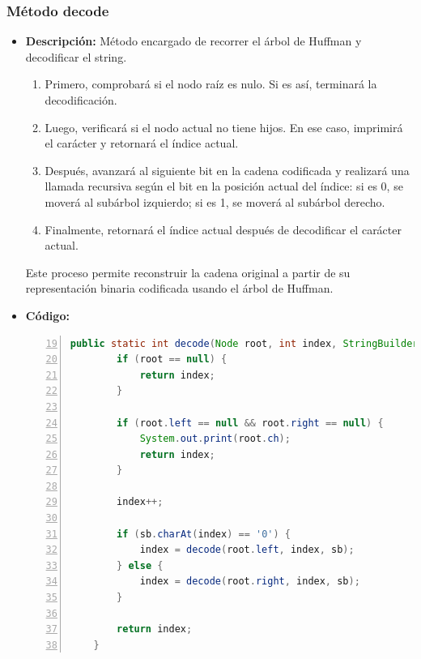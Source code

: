 \documentclass{article}
\begin{document}
  \subsubsection{Método decode}
  \begin{itemize}
    \item \textbf{Descripción: }Método encargado de recorrer el árbol de Huffman y decodificar el string.
    \begin{enumerate}
      \item Primero, comprobará si el nodo raíz es nulo. Si es así, terminará la decodificación.
      \item Luego, verificará si el nodo actual no tiene hijos. En ese caso, imprimirá el carácter y retornará el índice actual.
      \item Después, avanzará al siguiente bit en la cadena codificada y realizará una llamada recursiva según el bit en la posición actual del índice: si es 0, se moverá al subárbol izquierdo; si es 1, se moverá al subárbol derecho.
      \item Finalmente, retornará el índice actual después de decodificar el carácter actual.
    \end{enumerate}
    Este proceso permite reconstruir la cadena original a partir de su representación binaria codificada usando 
    el árbol de Huffman.
    \item \textbf{Código: }
    \begin{lstlisting}[language=java, numbers=left, firstnumber=19, numberstyle=\color{orange}]
    public static int decode(Node root, int index, StringBuilder sb) {
        if (root == null) {
            return index;
        }

        if (root.left == null && root.right == null) {
            System.out.print(root.ch);
            return index;
        }

        index++;

        if (sb.charAt(index) == '0') {
            index = decode(root.left, index, sb);
        } else {
            index = decode(root.right, index, sb);
        }

        return index;
    }
    \end{lstlisting}
  \end{itemize}
\end{document}
